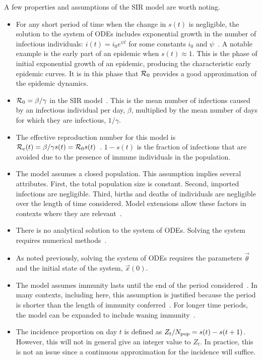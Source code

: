 \documentclass[thesis.tex]{subfiles}
\begin{document}
A few properties and assumptions of the SIR model are worth noting.
\begin{itemize}
    \item For any short period of time when the change in $s(t)$ is negligible, the solution to the system of ODEs includes exponential growth in the number of infectious individuals: $i(t) = i_0 e^{\psi t}$ for some constants $i_0$ and $\psi$~\autocite[section 1.2]{diekmannMathematical}.
    A notable example is the early part of an epidemic when $s(t) \approx 1$.
    This is the phase of initial exponential growth of an epidemic, producing the characteristic early epidemic curves.
    It is in this phase that $\mathcal{R}_{0}$ provides a good approximation of the epidemic dynamics.
    \item $\mathcal{R}_{0} = \beta / \gamma$ in the SIR model~\autocite[20]{keelingModeling}.
    This is the mean number of infections caused by an infectious individual per day, $\beta$, multiplied by the mean number of days for which they are infectious, $1/\gamma$.
    \item The effective reproduction number for this model is $\mathcal{R}_{e}(t) = \beta / \gamma s(t) = \mathcal{R}_{0} s(t)$~\autocite{pellisEstimation}.
    $1-s(t)$ is the fraction of infections that are avoided due to the presence of immune individuals in the population.
    \item The model assumes a closed population.
    This assumption implies several attributes.
    First, the total population size is constant.
    Second, imported infections are negligible. 
    Third, births and deaths of individuals are negligible over the length of time considered.
    Model extensions allow these factors in contexts where they are relevant~\autocites[26]{keelingModeling}[214]{kretzschmarMathematical}.
    \item There is no analytical solution to the system of ODEs.
      Solving the system requires numerical methods~\autocite[25]{keelingModeling}.
    \item As noted previously, solving the system of ODEs requires the parameters $\vec{\theta}$ and the initial state of the system, $\vec{x}(0)$.
    \item The model assumes immunity lasts until the end of the period considered~\autocite[61]{andersonInfectious}.
    In many contexts, including here, this assumption is justified because the period is shorter than the length of immunity conferred~\autocite{milneImmunity}.
    For longer time periods, the model can be expanded to include waning immunity~\autocite[40]{keelingModeling}.
    \item The incidence proportion on day $t$ is defined as $Z_t / N_\text{pop} = s(t) - s(t+1)$. However, this will not in general give an integer value to $Z_t$. In practice, this is not an issue since a continuous approximation for the incidence will suffice.
\end{itemize}
\end{document}
